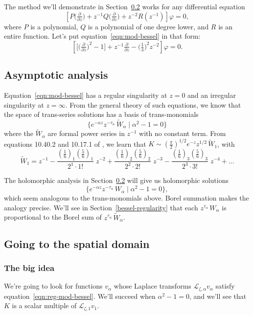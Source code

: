 \documentclass{article}
\theoremstyle{plain}
\newcommand{\laplace}{\mathcal{L}}
\newcommand{\series}[1]{\tilde{#1}}
\begin{document}
The method we'll demonstrate in Section~\ref{spatial} works for any differential equation
\[ \left[ P\big(\tfrac{\partial}{\partial z}\big) + z^{-1} Q\big(\tfrac{\partial}{\partial z}\big) + z^{-2} R(z^{-1}) \right] \varphi = 0, \]
where $P$ is a polynomial, $Q$ is a polynomial of one degree lower, and $R$ is an entire function. Let's put equation~\ref{eqn:mod-bessel} in that form:
\begin{equation}\label{eqn:reg-mod-bessel}
\left[ \big[ \big(\tfrac{\partial}{\partial z}\big)^2 - 1 \big] + z^{-1} \tfrac{\partial}{\partial z} - \big(\tfrac{1}{3}\big)^2 z^{-2} \right] \varphi = 0.
\end{equation}
\subsection{Asymptotic analysis}
Equation~\ref{eqn:mod-bessel} has a regular singularity at $z = 0$ and an irregular singularity at $z = \infty$. From the general theory of such equations, we know that the space of trans-series solutions has a basis of trans-monomials
\[ \{ e^{-\alpha z} z^{-\tau_\alpha}\,\series{W}_\alpha \mid \alpha^2 - 1 = 0 \} \]
where the $\series{W}_\alpha$ are formal power series in $z^{-1}$ with no constant term. From equations 10.40.2 and 10.17.1 of \cite{dlmf}, we learn that $K \sim \left(\tfrac{\pi}{2}\right)^{1/2} e^{-z} z^{1/2}\,\series{W}_1$, with
\begin{equation}\label{bessel-asymp}
\series{W}_1 = z^{-1} - \frac{(\tfrac{1}{6})_1 (\tfrac{5}{6})_1}{2^1 \cdot 1!}\;z^{-2} + \frac{(\tfrac{1}{6})_2 (\tfrac{5}{6})_2}{2^2 \cdot 2!}\;z^{-3} - \frac{(\tfrac{1}{6})_3 (\tfrac{5}{6})_3}{2^3 \cdot 3!}\;z^{-4} + \ldots
\end{equation}

The holomorphic analysis in Section~\ref{spatial} will give us holomorphic solutions
\[ \{ e^{-\alpha z} z^{-\tau_\alpha}\,W_\alpha \mid \alpha^2 - 1 = 0 \}, \]
which seem analogous to the trans-monomials above. Borel summation makes the analogy precise. We'll see in Section~\ref{bessel-regularity} that each $z^{\tau_\alpha}\,W_\alpha$ is proportional to the Borel sum of $z^{\tau_\alpha}\,\series{W}_\alpha$.
\subsection{Going to the spatial domain}\label{spatial}
\subsubsection{The big idea}\label{big-idea}
We're going to look for functions $v_\alpha$ whose Laplace transforms $\laplace_{\zeta, \alpha} v_\alpha$ satisfy equation~\ref{eqn:reg-mod-bessel}. We'll succeed when $\alpha^2 - 1 = 0$, and we'll see that $K$ is a scalar multiple of $\laplace_{\zeta, 1} v_1$.
\end{document}
